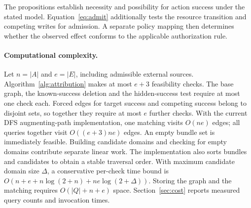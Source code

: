The propositions establish necessity and possibility for action success under the stated model. Equation~\eqref{eq:admit} additionally tests the resource transition and competing writes for admission. A separate policy mapping then determines whether the observed effect conforms to the applicable authorization rule.

\paragraph{Computational complexity.}
Let $n=|A|$ and $e=|E|$, including admissible external sources. Algorithm~\ref{alg:attribution} makes at most $e+3$ feasibility checks. The base graph, the known-success deletion and the hidden-success test require at most one check each. Forced edges for target success and competing success belong to disjoint sets, so together they require at most $e$ further checks. With the current DFS augmenting-path implementation, one matching visits $O(ne)$ edges; all queries together visit $O((e+3)ne)$ edges. An empty bundle set is immediately feasible. Building candidate domains and checking for empty domains contribute separate linear work. The implementation also sorts bundles and candidates to obtain a stable traversal order. With maximum candidate domain size $\Delta$, a conservative per-check time bound is $O(n+e+n\log(2+n)+ne\log(2+\Delta))$. Storing the graph and the matching requires $O(|Q|+n+e)$ space. Section~\ref{sec:cost} reports measured query counts and invocation times.
